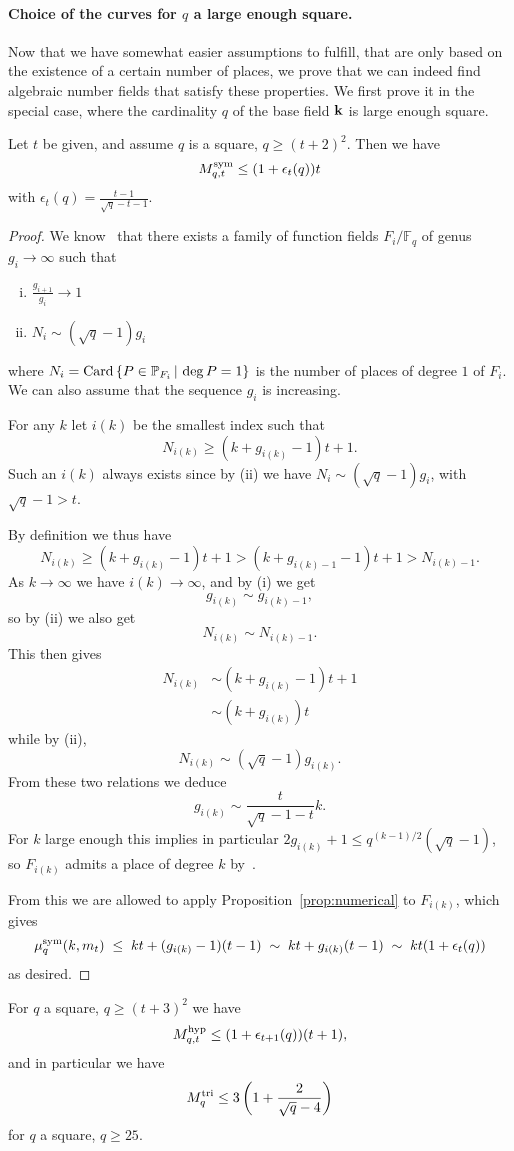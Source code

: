 \paragraph{Choice of the curves for $q$ a large enough square.}
Now that we have somewhat easier assumptions to fulfill, that are only based on
the existence of a certain number of places, we prove that we can indeed find
algebraic number fields that satisfy these properties. We first prove it in the
special case, where the cardinality $q$ of the base field $\mathbf{k}$ is large enough
square.
\begin{prop}
\label{prop:asymptsquare}
Let $t$ be given, and assume $q$ is a square, $q\geq(t+2)^2$.
Then we have
\[
M^{\textrm{sym}}_{q,t}\leq(1+\epsilon_t(q))t
\]
with $\epsilon_t(q)=\frac{t-1}{\sqrt{q}-t-1}$.
\end{prop}
\begin{proof}
We know~\cite{STV92} that there exists a family of function fields
$F_i/\mathbb{F}_q$ of genus $g_i\to\infty$ such that
\begin{enumerate}[(i)]
  \item $\frac{g_{i+1}}{g_i}\to1$
  \item $N_i\sim (\sqrt q - 1)g_i$
\end{enumerate}
where $N_i = \operatorname{Card}\left\{ P\in\mathbb{P}_{F_i}\,|\,\deg P = 1 \right\}$
is the number of places of degree $1$ of $F_i$. We can also assume that the sequence
$g_i$ is increasing. 

For any $k$ let $i(k)$ be the smallest index such that
\[ N_{i(k)} \geq (k + g_{i(k)}-1)t +1. \]
Such an $i(k)$ always exists since by (ii) we have $N_i\sim (\sqrt q - 1)g_i$,
with $\sqrt q - 1>t$.

By definition we thus have
\[ N_{i(k)} \geq (k + g_{i(k)}-1)t +1 > (k + g_{i(k)-1}-1)t +1 > N_{i(k)-1}. \]
As $k\to\infty$ we have $i(k)\to\infty$, and by (i) we get 
\[
  g_{i(k)}\sim g_{i(k)-1},
\]
so by (ii) we also get 
\[
  N_{i(k)}\sim N_{i(k)-1}.
\]
This then gives
\[ \begin{split} N_{i(k)} &\sim (k + g_{i(k)}-1)t +1\\ &\sim (k + g_{i(k)})t \end{split} \]
while by (ii),
\[ N_{i(k)} \sim (\sqrt q - 1)g_{i(k)}. \]
From these two relations we deduce
\[ g_{i(k)} \sim \frac{t}{\sqrt{q}-1-t}k. \]
For $k$ large enough this implies in particular $2g_{i(k)} +1 \leq q^{(k-1)/2}(\sqrt q-1)$,
so $F_{i(k)}$ admits a place of degree $k$ by~\cite[Cor.~5.2.10]{Stichtenoth09}.

From this we are allowed to apply Proposition~\ref{prop:numerical} to $F_{i(k)}$, which gives
\[ \mu^{\textrm{sym}}_q(k,m_t)\;\leq\; kt+(g_{i(k)}-1)(t-1)\;\sim\; kt+g_{i(k)}(t-1)\;\sim\; kt(1+\epsilon_t(q)) \]
as desired.
\end{proof}
\begin{cor}
\label{cor:asymptsquare}
For $q$ a square, $q\geq(t+3)^2$ we have
\[
M^{\textrm{hyp}}_{q,t}\leq(1+\epsilon_{t+1}(q))(t+1),
\]
and in particular we have
\[ M^{\textrm{tri}}_q\leq 3\left(1+\frac{2}{\sqrt{q}-4}\right) \]
for $q$ a square, $q\geq 25$.
\end{cor}

